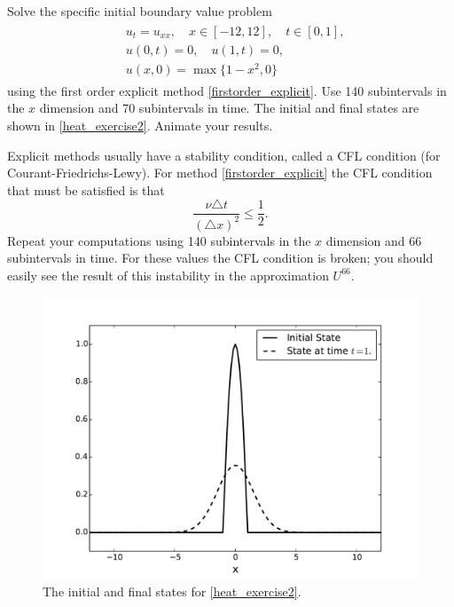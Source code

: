 \begin{problem}
	Solve the specific initial boundary value problem
	\begin{align}
		\begin{split}
		&{ } u_t = u_{xx}, \quad x \in [-12,12],\quad t \in [0,1], \\
		&{ } u(0,t) = 0,\quad u(1,t) = 0,\\
		&{ } u(x,0) = \max\{1 - x^2,0\}
		\end{split}\label{heat_exercise2}
	\end{align}
	using the first order explicit method \ref{firstorder_explicit}.  Use 140 subintervals in the $x$ dimension and 70 subintervals in time. The initial and final states are shown in \ref{heat_exercise2}. Animate your results. 
	
	Explicit methods usually have a stability condition, called a CFL condition (for Courant-Friedrichs-Lewy). For method \ref{firstorder_explicit} the CFL condition that must be satisfied is that 
	\[ \frac{\nu \triangle t}{(\triangle x)^2} \leq \frac{1}{2}.\]
	Repeat your computations using 140 subintervals in the $x$ dimension and 66 subintervals in time. For these values the CFL condition is broken; you should easily see the result of this instability in the approximation $U^{66}$.
\end{problem}

\begin{figure}[ht]
\centering
\includegraphics[width=12cm]{heatexercise2.pdf}
\caption{The initial and final states for \ref{heat_exercise2}.}
\label{figure2}
\end{figure}


